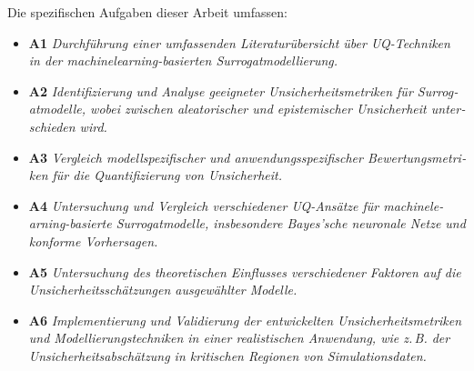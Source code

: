 \begin{otherlanguage}{ngerman}
Die spezifischen Aufgaben dieser Arbeit umfassen:

\begin{itemize}
  \item \textbf{A1} \textit{Durchführung einer umfassenden Literaturübersicht über UQ-Techniken in der \gls{machinelearning}-basierten Surrogatmodellierung.}
  \item \textbf{A2} \textit{Identifizierung und Analyse geeigneter Unsicherheitsmetriken für Surrogatmodelle, wobei zwischen aleatorischer und epistemischer Unsicherheit unterschieden wird.}
  \item \textbf{A3} \textit{Vergleich modellspezifischer und anwendungsspezifischer Bewertungsmetriken für die Quantifizierung von Unsicherheit.}
  \item \textbf{A4} \textit{Untersuchung und Vergleich verschiedener UQ-Ansätze für \gls{machinelearning}-basierte Surrogatmodelle, insbesondere Bayes'sche neuronale Netze und konforme Vorhersagen.}
  \item \textbf{A5} \textit{Untersuchung des theoretischen Einflusses verschiedener Faktoren auf die Unsicherheitsschätzungen ausgewählter Modelle.}
  \item \textbf{A6} \textit{Implementierung und Validierung der entwickelten Unsicherheitsmetriken und Modellierungstechniken in einer realistischen Anwendung, wie z.\,B. der Unsicherheitsabschätzung in kritischen Regionen von Simulationsdaten.}
\end{itemize}
\end{otherlanguage}
